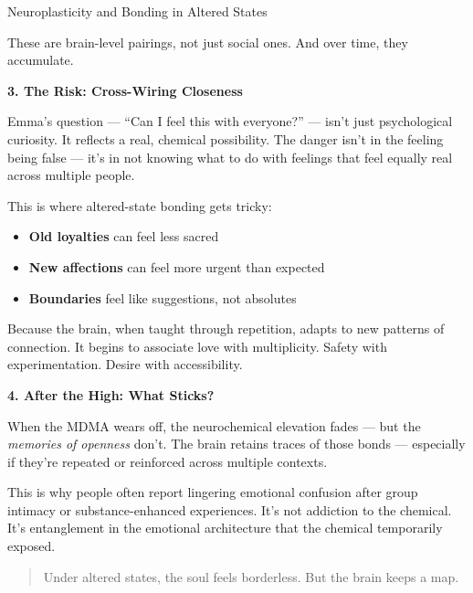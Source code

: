 \begin{TechnicalSidebar}{Neuroplasticity and Bonding in Altered States}
  \medskip
  
  
  These are brain-level pairings, not just social ones.
  And over time, they accumulate.
  
  \medskip
  
  \textbf{3. The Risk: Cross-Wiring Closeness}

  \medskip
  
  
  Emma’s question — “Can I feel this with everyone?” — isn’t just psychological curiosity.
  It reflects a real, chemical possibility.
  The danger isn’t in the feeling being false — it’s in not knowing what to do with feelings 
  that feel equally 
  real across multiple people.

  \medskip
  
  
  This is where altered-state bonding gets tricky:

  \medskip
  
  
  \begin{itemize}
    \item \textbf{Old loyalties} can feel less sacred
    \item \textbf{New affections} can feel more urgent than expected
    \item \textbf{Boundaries} feel like suggestions, not absolutes
  \end{itemize}

  \medskip
  
  
  Because the brain, when taught through repetition, adapts to new patterns of connection.
  It begins to associate love with multiplicity.
  Safety with experimentation.
  Desire with accessibility.
  
  \medskip
  

  \textbf{4. After the High: What Sticks?}

  \medskip
  
  
  When the MDMA wears off, the neurochemical elevation fades — but the \textit{memories 
  of openness} don’t.
  The brain retains traces of those bonds — especially if they’re repeated or reinforced 
  across multiple contexts.

  \medskip
  
  
  This is why people often report lingering emotional confusion after group intimacy or 
  substance-enhanced 
  experiences. It’s not addiction to the chemical.
  It’s entanglement in the emotional architecture that the chemical temporarily exposed.
  
  \medskip
  
  \begin{quote}
  Under altered states, the soul feels borderless.
  But the brain keeps a map.
  \end{quote}

\end{TechnicalSidebar}


